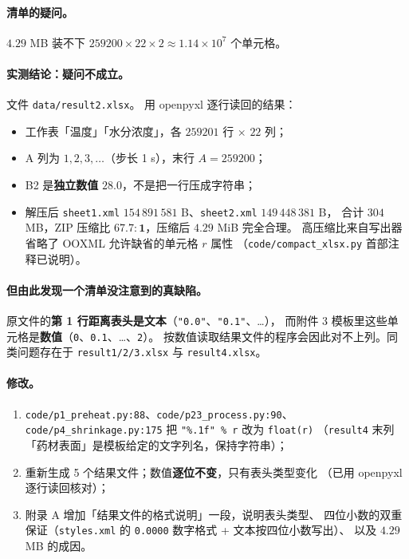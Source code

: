 \documentclass[11pt,a4paper]{ctexart}
\newcommand{\src}[1]{\texttt{#1}}
\newcommand{\loc}[1]{\textcolor{blue!60!black}{#1}}
\begin{document}
\paragraph{清单的疑问。}$4.29$ MB 装不下 $259200\times22\times2\approx1.14\times10^7$ 个单元格。

\paragraph{实测结论：疑问不成立。}\loc{文件 \src{data/result2.xlsx}}。
用 openpyxl 逐行读回的结果：

\begin{itemize}[leftmargin=1.6em,itemsep=2pt]
  \item 工作表「温度」「水分浓度」，各 $259201$ 行 $\times$ $22$ 列；
  \item A 列为 $1,2,3,\dots$（步长 1 s），末行 $A=259200$；
  \item B2 是\textbf{独立数值} $28.0$，不是把一行压成字符串；
  \item 解压后 \src{sheet1.xml} $154\,891\,581$ B、\src{sheet2.xml} $149\,448\,381$ B，
  合计 $304$ MB，ZIP 压缩比 $\mathbf{67.7:1}$，压缩后 $4.29$ MiB 完全合理。
  高压缩比来自写出器省略了 OOXML 允许缺省的单元格 $r$ 属性
  （\src{code/compact\_xlsx.py} 首部注释已说明）。
\end{itemize}

\paragraph{但由此发现一个清单没注意到的真缺陷。}
原文件的\textbf{第 1 行距离表头是文本}（\src{"0.0"}、\src{"0.1"}、\dots），
而附件 3 模板里这些单元格是\textbf{数值}（\src{0}、\src{0.1}、\dots、\src{2}）。
按数值读取结果文件的程序会因此对不上列。同类问题存在于
\src{result1/2/3.xlsx} 与 \src{result4.xlsx}。

\paragraph{修改。}
\begin{enumerate}[leftmargin=1.8em,itemsep=2pt]
  \item \src{code/p1\_preheat.py:88}、\src{code/p23\_process.py:90}、
  \src{code/p4\_shrinkage.py:175} 把 \src{"\%.1f" \% r} 改为 \src{float(r)}
  （\src{result4} 末列「药材表面」是模板给定的文字列名，保持字符串）；
  \item 重新生成 5 个结果文件；数值\textbf{逐位不变}，只有表头类型变化
  （已用 openpyxl 逐行读回核对）；
  \item 附录 A 增加「结果文件的格式说明」一段，说明表头类型、
  四位小数的双重保证（\src{styles.xml} 的 \src{0.0000} 数字格式 + 文本按四位小数写出）、
  以及 $4.29$ MB 的成因。
\end{enumerate}
\end{document}
